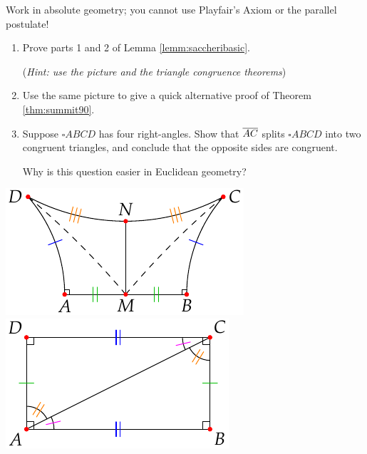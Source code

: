 \begin{exercises}
	Work in absolute geometry; you cannot use Playfair's Axiom or the parallel postulate!
	
	\begin{minipage}[t]{0.64\linewidth}\vspace{-2pt}
		\begin{enumerate}
		  \item Prove parts 1 and 2 of Lemma \ref{lemm:saccheribasic}.\par
		  (\emph{Hint: use the picture and the triangle congruence theorems})
		  
			\item Use the same picture to give a quick alternative proof of Theorem \ref{thm:summit90}.
		
			\item\label{exs:rectanglesplit} Suppose $\square ABCD$ has four right-angles. Show that $\overline{AC}$ splits $\square ABCD$ into two congruent triangles, and conclude that the opposite sides are congruent.\par
			Why is this question easier in Euclidean geometry?
		\end{enumerate}
	\end{minipage}
	\hfill
	\begin{minipage}[t]{0.35\linewidth}\vspace{-8pt}
		\flushright\includegraphics{history-saccheri2}\\
		\includegraphics{basic-rect}
	\end{minipage}
\end{exercises}

